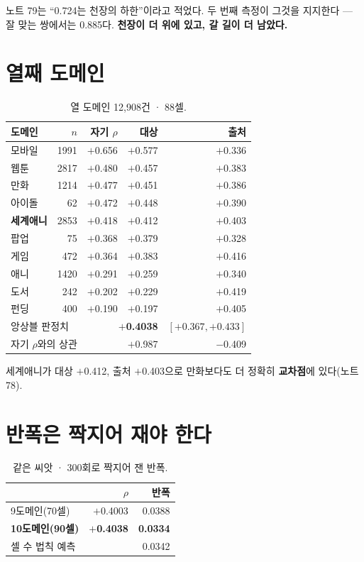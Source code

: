 \documentclass[10pt]{article}
\begin{document}
노트 79는 ``0.724는 천장의 하한''이라고 적었다. 두 번째 측정이 그것을 지지한다
--- 잘 맞는 쌍에서는 0.885다. \textbf{천장이 더 위에 있고, 갈 길이 더 남았다.}

\section{열째 도메인}

\begin{table}[t]
\centering\tsize
\caption{열 도메인 12,908건 · 88셀.}
\begin{tabular}{lrrrr}
\toprule
도메인 & $n$ & 자기 $\rho$ & 대상 & 출처 \\
\midrule
모바일 & 1991 & $+$0.656 & $+$0.577 & $+$0.336 \\
웹툰 & 2817 & $+$0.480 & $+$0.457 & $+$0.383 \\
만화 & 1214 & $+$0.477 & $+$0.451 & $+$0.386 \\
아이돌 & 62 & $+$0.472 & $+$0.448 & $+$0.390 \\
\textbf{세계애니} & 2853 & $+$0.418 & $+$0.412 & $+$0.403 \\
팝업 & 75 & $+$0.368 & $+$0.379 & $+$0.328 \\
게임 & 472 & $+$0.364 & $+$0.383 & $+$0.416 \\
애니 & 1420 & $+$0.291 & $+$0.259 & $+$0.340 \\
도서 & 242 & $+$0.202 & $+$0.229 & $+$0.419 \\
펀딩 & 400 & $+$0.190 & $+$0.197 & $+$0.405 \\
\midrule
\multicolumn{2}{l}{앙상블 판정치} & \multicolumn{2}{r}{\textbf{$+$0.4038}} &
$[+0.367, +0.433]$ \\
\multicolumn{2}{l}{자기 $\rho$와의 상관} & & $+$0.987 & $-$0.409 \\
\bottomrule
\end{tabular}
\end{table}

세계애니가 대상 $+$0.412, 출처 $+$0.403으로 만화보다도 더 정확히 \textbf{교차점}에
있다(노트 78).

\section{반폭은 짝지어 재야 한다}

\begin{table}[t]
\centering\tsize
\caption{같은 씨앗 · 300회로 짝지어 잰 반폭.}
\begin{tabular}{lrr}
\toprule
& $\rho$ & 반폭 \\
\midrule
9도메인(70셀) & $+$0.4003 & 0.0388 \\
\textbf{10도메인(90셀)} & \textbf{$+$0.4038} & \textbf{0.0334} \\
\midrule
\multicolumn{2}{l}{셀 수 법칙 예측} & 0.0342 \\
\bottomrule
\end{tabular}
\end{table}
\end{document}
